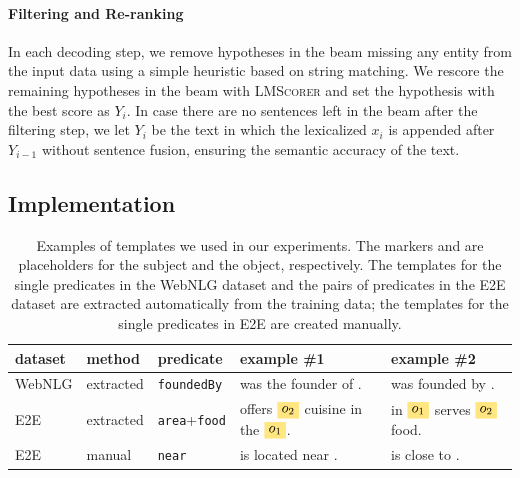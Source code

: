 \paragraph{Filtering and Re-ranking} In each decoding step, we remove hypotheses in the beam missing any entity from the input data using a simple heuristic based on string matching. We rescore the remaining hypotheses in the beam with \textsc{LMScorer} and set the hypothesis with the best score as $Y_{i}$. In case there are no sentences left in the beam after the filtering step, we let $Y_{i}$ be the text in which the lexicalized $x_i$ is appended after $Y_{i-1}$ without sentence fusion, ensuring the semantic accuracy of the text.



\subsection{Implementation}
\label{sec:iterative:implementation}

\begin{table}[t]
    \centering\footnotesize
    \begin{tabular}{@{}lllll@{}}
        \textbf{dataset} & \textbf{method} & \textbf{predicate}          & \textbf{example \#1}                       & \textbf{example \#2}                \\\midrule
        WebNLG           & extracted       & \texttt{foundedBy}          & \et{} was the founder of \eh{}.            & \eh{} was founded by \et{}.         \\
        E2E              & extracted       & \texttt{area}+\texttt{food} & \eh{} offers $\ets$ cuisine in the $\etf$. & \eh{} in $\etf$ serves $\ets$ food. \\
        E2E              & manual          & \texttt{near}               & \eh{} is located near \et{}.               & \et{} is close to \eh{}.
    \end{tabular}
    \caption{Examples of templates we used in our experiments. The markers \eh{} and \et{} are placeholders for the subject and the object, respectively. The templates for the single predicates in the WebNLG dataset and the pairs of predicates in the E2E dataset are extracted automatically from the training data; the templates for the single predicates in E2E are created manually.}
    \label{tab:iterative:templates_ex}
\end{table}


